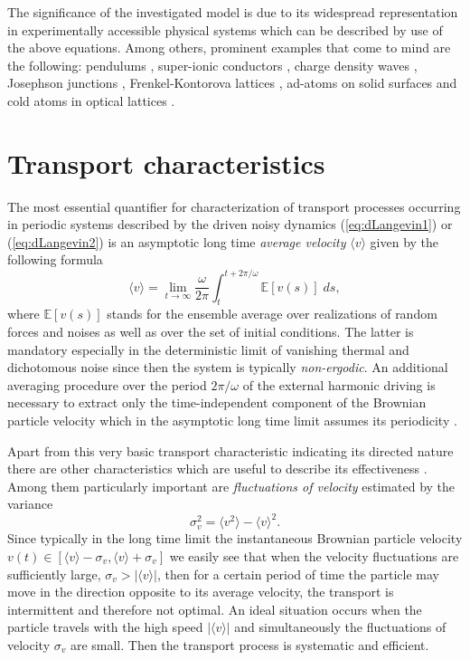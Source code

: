 \documentclass[12pt]{iopart}
\begin{document}
The significance of the investigated model is due to its widespread representation in experimentally accessible physical systems which can be described by use of the above equations. Among others, prominent examples that come to mind are the following: pendulums \cite{gitterman2010}, super-ionic conductors \cite{fulde1977}, charge density waves \cite{gruner1981}, Josephson junctions \cite{kautz1996}, Frenkel-Kontorova lattices \cite{braun1998}, ad-atoms on solid surfaces \cite{guantes2001} and cold atoms in optical lattices \cite{renzon1,renzon2,denisov2014}. 


\section{Transport characteristics}
\label{sec4}
The most essential quantifier for characterization of transport processes occurring in periodic systems described by the driven noisy dynamics (\ref{eq:dLangevin1}) or (\ref{eq:dLangevin2}) is an asymptotic long time \emph{average velocity} $\langle v \rangle$ given by the following formula
\begin{equation}
	\langle v \rangle = \lim_{t\to\infty} \frac{\omega}{2\pi} \int_{t}^{t+2\pi/\omega} 
{\mathbb E}[v(s)] \; ds, 
\end{equation}
where ${\mathbb E}[v(s)]$ stands for the ensemble average over realizations of random forces and noises as well as over the set of initial conditions. The latter is mandatory especially in the deterministic limit of vanishing thermal and dichotomous noise since then the system is typically \emph{non-ergodic}. An additional averaging procedure over the period $2\pi/\omega$ of the external harmonic driving is necessary to extract only the time-independent component of the Brownian particle velocity which in the asymptotic long time limit assumes its periodicity \cite{acta_jj,jung1993,spiechNJP}.

Apart from this very basic transport characteristic indicating its directed nature there are other characteristics which are useful to describe its effectiveness \cite{jung1996,linke2005,MacKos2004}. Among them particularly 
important are \emph{fluctuations of velocity} estimated by the variance 
\begin{equation}
	\sigma_v^2 = \langle v^2 \rangle - \langle v \rangle^2.
\end{equation}
Since typically in the long time limit the instantaneous Brownian particle velocity $v(t) \in [\langle v \rangle - \sigma_v, \langle v \rangle + \sigma_v]$ we easily see that when the velocity fluctuations are sufficiently large, 
$\sigma_v > |\langle v \rangle|$, then for a certain period of time the particle may move in the direction opposite to its average velocity, the transport is intermittent and therefore not optimal. An ideal situation occurs when the particle travels with the high speed $|\langle v \rangle|$ and simultaneously the fluctuations of velocity $\sigma_v$ are small. Then the transport process is systematic and efficient.
\end{document}
